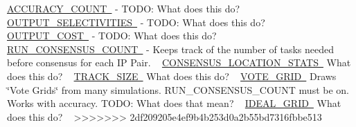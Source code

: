  \mbox{\hyperlink{}{A\+C\+C\+U\+R\+A\+C\+Y\+\_\+\+C\+O\+U\+NT }} -\/ T\+O\+DO\+: What does this do? ~\newline
 \mbox{\hyperlink{}{O\+U\+T\+P\+U\+T\+\_\+\+S\+E\+L\+E\+C\+T\+I\+V\+I\+T\+I\+ES }} -\/ T\+O\+DO\+: What does this do? ~\newline
 \mbox{\hyperlink{}{O\+U\+T\+P\+U\+T\+\_\+\+C\+O\+ST }} -\/ T\+O\+DO\+: What does this do? ~\newline
 \mbox{\hyperlink{}{R\+U\+N\+\_\+\+C\+O\+N\+S\+E\+N\+S\+U\+S\+\_\+\+C\+O\+U\+NT }} -\/ Keeps track of the number of tasks needed before consensus for each IP Pair. ~\newline
 \mbox{\hyperlink{}{C\+O\+N\+S\+E\+N\+S\+U\+S\+\_\+\+L\+O\+C\+A\+T\+I\+O\+N\+\_\+\+S\+T\+A\+TS }} What does this do? ~\newline
 \mbox{\hyperlink{}{T\+R\+A\+C\+K\+\_\+\+S\+I\+ZE }} What does this do? ~\newline
 \mbox{\hyperlink{}{V\+O\+T\+E\+\_\+\+G\+R\+ID }} Draws \char`\"{}\+Vote Grids\char`\"{} from many simulations. R\+U\+N\+\_\+\+C\+O\+N\+S\+E\+N\+S\+U\+S\+\_\+\+C\+O\+U\+NT must be on. Works with accuracy. T\+O\+DO\+: What does that mean? ~\newline
 \mbox{\hyperlink{}{I\+D\+E\+A\+L\+\_\+\+G\+R\+ID }} What does this do? ~\newline
>>>>>>> 2df209205e4ef9b4b253d0a2b55bd7316fbbe513
